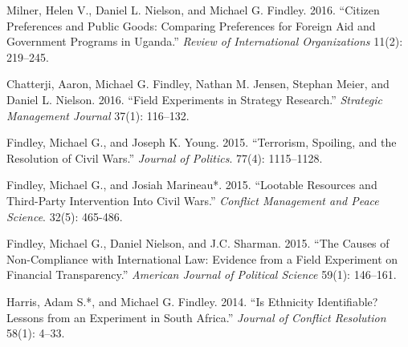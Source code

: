 \documentclass[10pt]{article}
\begin{document}
\begin{etaremune}
\item Milner, Helen V., Daniel L. Nielson, and Michael G. Findley. 2016. ``Citizen Preferences and Public Goods: Comparing Preferences for Foreign Aid and Government Programs in Uganda.'' \textit{Review of International Organizations} 11(2): 219--245. 



\item Chatterji, Aaron, Michael G. Findley, Nathan M. Jensen, Stephan Meier, and Daniel L. Nielson. 2016. ``Field Experiments in Strategy Research.'' \textit{Strategic Management Journal} 37(1): 116--132.


\item Findley, Michael G., and Joseph K. Young. 2015. ``Terrorism, Spoiling, and the Resolution of Civil Wars.'' \textit{Journal of Politics}. 77(4): 1115--1128.



\item Findley, Michael G., and Josiah Marineau*. 2015. ``Lootable Resources and Third-Party Intervention Into Civil Wars.'' \textit{Conflict Management and Peace Science}. 32(5): 465-486.


\item Findley, Michael G., Daniel Nielson, and J.C. Sharman. 2015. ``The Causes of Non-Compliance with International Law: Evidence from a Field Experiment on Financial Transparency.'' \textit{American Journal of Political Science} 59(1): 146--161.



\item Harris, Adam S.*, and Michael G. Findley. 2014. ``Is Ethnicity Identifiable? Lessons from an Experiment in South Africa.'' \textit{Journal of Conflict Resolution} 58(1): 4--33.




\end{etaremune}
\end{document}
